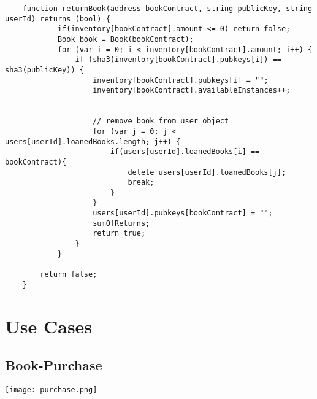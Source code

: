 \begin{lstlisting}
	function returnBook(address bookContract, string publicKey, string userId) returns (bool) {
    		if(inventory[bookContract].amount <= 0) return false;
    		Book book = Book(bookContract);
            for (var i = 0; i < inventory[bookContract].amount; i++) {
                if (sha3(inventory[bookContract].pubkeys[i]) == sha3(publicKey)) {
                    inventory[bookContract].pubkeys[i] = "";
                    inventory[bookContract].availableInstances++;


                    // remove book from user object
                    for (var j = 0; j < users[userId].loanedBooks.length; j++) {
                        if(users[userId].loanedBooks[i] == bookContract){
                            delete users[userId].loanedBooks[j];
                            break;
                        }
                    }
                    users[userId].pubkeys[bookContract] = "";
                    sumOfReturns;
                    return true;
                }
            }

        return false;
    }
\end{lstlisting}




\section{Use Cases}
\subsection{Book-Purchase}

\vspace{0.3cm}
\texttt{[image: purchase.png]}

